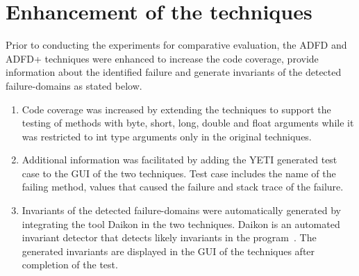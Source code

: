 \section{Enhancement of the techniques}
Prior to conducting the experiments for comparative evaluation, the ADFD and ADFD+ techniques were enhanced to increase the code coverage, provide information about the identified failure and generate invariants of the detected failure-domains as stated below.
\begin{enumerate}

\item Code coverage was increased by extending the techniques to support the testing of methods with byte, short, long, double and float arguments while it was restricted to int type arguments only in the original techniques.

\item Additional information was facilitated by adding the YETI generated test case to the GUI of the two techniques. Test case includes the name of the failing method, values that caused the failure and stack trace of the failure.

\item Invariants of the detected failure-domains were automatically generated by integrating the tool Daikon in the two techniques. Daikon is an automated invariant detector that detects likely invariants in the program~\cite{ernst2007daikon}. The generated invariants are displayed in the GUI of the techniques after completion of the test. 

\end{enumerate}

